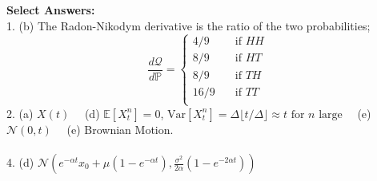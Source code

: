 \documentclass[11pt]{article}
\newcommand{\PR}{\mathbb{P}}
\begin{document}
	\textbf{Select Answers:}\\
	1. (b) The Radon-Nikodym derivative is the ratio of the two probabilities;
	\[	\frac{d\mathcal{Q}}{d\PR} = \begin{cases}
										4/9 & \quad \text{if }HH\\
										8/9 & \quad \text{if }HT\\
										8/9 & \quad \text{if }TH\\
										16/9 & \quad \text{if }TT\\
										\end{cases}
			\] 
	2. (a) $X(t)\quad$ (d) $\mathbb{E}[X^{n}_{t}] = 0$, $\text{Var}[X^{n}_{t}] = \Delta \lfloor t/ \Delta\rfloor\approx t \text{ for $n$ large}\quad$ (e) $\mathcal{N}(0,t)\quad$ (e) Brownian Motion.\\\\
	4. (d) $\mathcal{N}\left(e^{-\alpha t}x_{0} + \mu(1 - e^{-\alpha t}), \frac{\sigma^{2}}{2\alpha}(1 - e^{-2\alpha t})\right)$
	
\end{document}
